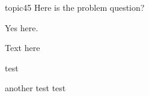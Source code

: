 \begin{problem}[requires=some label]{topic}{45}
Here is the problem question?

Yes here.

\begin{answers}
\answer[correct] Text here

    test

\answer[correct] another test
             test
\end {answers}
 
 \end{problem}